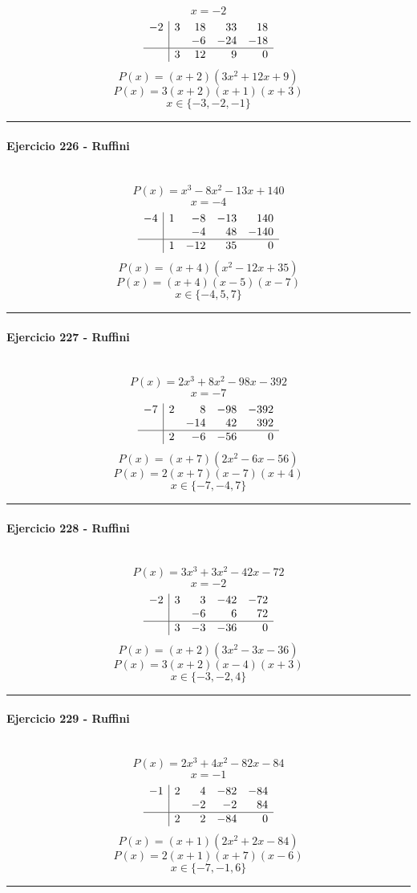 \documentclass[10pt,a4paper]{article}
\newcommand{\res}[1]{\paragraph{#1}\mbox{}\\[-1.2em]}
\begin{document}
\[ x=-2 \]
\[\begin{array}{r|rrrr}-2 & 3 & 18 & 33 & 18\\  &  & -6 & -24 & -18\\\hline  & 3 & 12 & 9 & 0\end{array}\]
\[ P(x)=(x+2)(3 x^{2} + 12 x + 9) \]
\[ P(x)=3(x+2)(x+1)(x+3) \]
\[ \boxed{x\in\{-3,-2,-1\}} \]
\vspace{1mm}\hrule\vspace{2mm}
\res{Ejercicio 226 - Ruffini}
\[ P(x)=x^{3} - 8 x^{2} - 13 x + 140 \]
\[ x=-4 \]
\[\begin{array}{r|rrrr}-4 & 1 & -8 & -13 & 140\\  &  & -4 & 48 & -140\\\hline  & 1 & -12 & 35 & 0\end{array}\]
\[ P(x)=(x+4)(x^{2} - 12 x + 35) \]
\[ P(x)=(x+4)(x-5)(x-7) \]
\[ \boxed{x\in\{-4,5,7\}} \]
\vspace{1mm}\hrule\vspace{2mm}
\res{Ejercicio 227 - Ruffini}
\[ P(x)=2 x^{3} + 8 x^{2} - 98 x - 392 \]
\[ x=-7 \]
\[\begin{array}{r|rrrr}-7 & 2 & 8 & -98 & -392\\  &  & -14 & 42 & 392\\\hline  & 2 & -6 & -56 & 0\end{array}\]
\[ P(x)=(x+7)(2 x^{2} - 6 x - 56) \]
\[ P(x)=2(x+7)(x-7)(x+4) \]
\[ \boxed{x\in\{-7,-4,7\}} \]
\vspace{1mm}\hrule\vspace{2mm}
\res{Ejercicio 228 - Ruffini}
\[ P(x)=3 x^{3} + 3 x^{2} - 42 x - 72 \]
\[ x=-2 \]
\[\begin{array}{r|rrrr}-2 & 3 & 3 & -42 & -72\\  &  & -6 & 6 & 72\\\hline  & 3 & -3 & -36 & 0\end{array}\]
\[ P(x)=(x+2)(3 x^{2} - 3 x - 36) \]
\[ P(x)=3(x+2)(x-4)(x+3) \]
\[ \boxed{x\in\{-3,-2,4\}} \]
\vspace{1mm}\hrule\vspace{2mm}
\res{Ejercicio 229 - Ruffini}
\[ P(x)=2 x^{3} + 4 x^{2} - 82 x - 84 \]
\[ x=-1 \]
\[\begin{array}{r|rrrr}-1 & 2 & 4 & -82 & -84\\  &  & -2 & -2 & 84\\\hline  & 2 & 2 & -84 & 0\end{array}\]
\[ P(x)=(x+1)(2 x^{2} + 2 x - 84) \]
\[ P(x)=2(x+1)(x+7)(x-6) \]
\[ \boxed{x\in\{-7,-1,6\}} \]
\vspace{1mm}\hrule\vspace{2mm}
\end{document}
